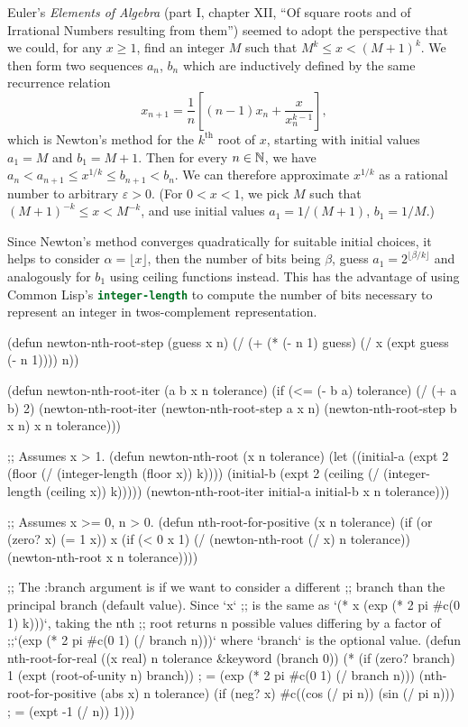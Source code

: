 Euler's \textit{Elements of Algebra} (part I, chapter XII, ``Of square
roots and of Irrational Numbers resulting from them'') seemed to adopt
the perspective that we could, for any $x\geq1$, 
find an integer $M$ such that $M^{k}\leq x < (M+1)^{k}$. We then form
two sequences $a_{n}$, $b_{n}$ which are inductively defined by the same
recurrence relation
\begin{equation}
x_{n+1} = \frac{1}{n}\left[(n-1)x_{n} + \frac{x}{x_{n}^{k-1}}\right],
\end{equation}
which is Newton's method for the $k^{\text{th}}$ root of $x$, starting
with initial values $a_{1}=M$ and $b_{1}=M+1$. Then for every $n\in\mathbb{N}$,
we have $a_{n}<a_{n+1}\leq x^{1/k}\leq b_{n+1}<b_{n}$. We can therefore
approximate $x^{1/k}$ as a rational number to arbitrary $\varepsilon>0$.
(For $0<x<1$, we pick $M$ such that $(M+1)^{-k}\leq x < M^{-k}$,
and use initial values $a_{1} = 1/(M + 1)$, $b_{1} = 1/M$.)

Since Newton's method converges quadratically for suitable initial
choices, it helps to consider $\alpha = \lfloor x\rfloor$, then the
number of bits being $\beta$, guess $a_{1}=2^{\lfloor \beta/k\rfloor}$
and analogously for $b_{1}$ using ceiling functions instead. This has
the advantage of using Common Lisp's \lstinline[language=lisp]{integer-length}
to compute the number of bits necessary to represent an integer in
twos-complement representation.

\begin{lisp-example}
(defun newton-nth-root-step (guess x n)
  (/ (+ (* (- n 1) guess)
        (/ x (expt guess (- n 1))))
     n))

(defun newton-nth-root-iter (a b x n tolerance)
  (if (<= (- b a) tolerance)
    (/ (+ a b) 2)
    (newton-nth-root-iter (newton-nth-root-step a x n)
                          (newton-nth-root-step b x n)
                          x
                          n
                          tolerance)))

;; Assumes x > 1.
(defun newton-nth-root (x n tolerance)
  (let ((initial-a (expt 2 (floor (/ (integer-length (floor x)) k))))
        (initial-b (expt 2 (ceiling (/ (integer-length (ceiling x)) k)))))
    (newton-nth-root-iter initial-a initial-b x n tolerance)))

;; Assumes x >= 0, n > 0.
(defun nth-root-for-positive (x n tolerance)
  (if (or (zero? x) (= 1 x))
    x
    (if (< 0 x 1)
       (/ (newton-nth-root (/ x) n tolerance))
       (newton-nth-root x n tolerance))))

;; The :branch argument is if we want to consider a different
;; branch than the principal branch (default value). Since `x`
;; is the same as `(* x (exp (* 2 pi #c(0 1) k)))`, taking the nth
;; root returns n possible values differing by a factor of
;;`(exp (* 2 pi #c(0 1) (/ branch n)))` where `branch` is the optional value. 
(defun nth-root-for-real ((x real) n tolerance &keyword (branch 0))
  (* (if (zero? branch)
       1
       (expt (root-of-unity n) branch))  ; = (exp (* 2 pi #c(0 1) (/ branch n)))
     (nth-root-for-positive (abs x) n tolerance)
     (if (neg? x)
       #c((cos (/ pi n)) (sin (/ pi n))) ; = (expt -1 (/ n))
       1)))
\end{lisp-example}

